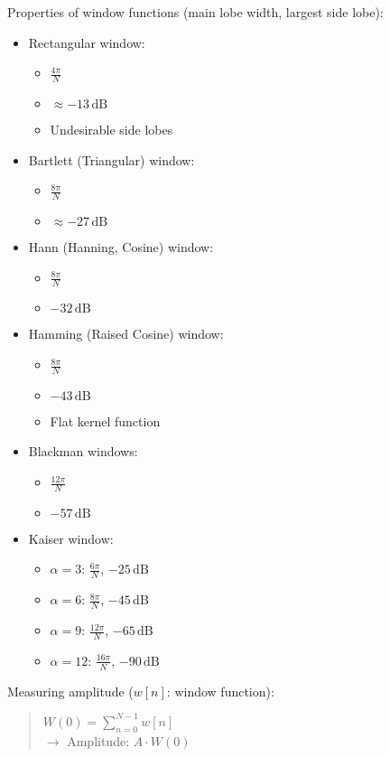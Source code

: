 \documentclass[fontsize=9pt,a4paper,twocolumn]{scrartcl}
\begin{document}
Properties of window functions (main lobe width, largest side lobe):
\begin{itemize}
	\item Rectangular window:
	\begin{itemize}
		\item $\frac{4\pi}{N}$
		\item $\approx -13\,\mathrm{dB}$
		\item Undesirable side lobes
	\end{itemize}
	\item Bartlett (Triangular) window:
	\begin{itemize}
		\item $\frac{8\pi}{N}$
		\item $\approx -27\,\mathrm{dB}$
	\end{itemize}
	\item Hann (Hanning, Cosine) window:
	\begin{itemize}
		\item $\frac{8\pi}{N}$
		\item $-32\,\mathrm{dB}$
	\end{itemize}
	\item Hamming (Raised Cosine) window:
	\begin{itemize}
		\item $\frac{8\pi}{N}$
		\item $-43\,\mathrm{dB}$
		\item Flat kernel function
	\end{itemize}
	\item Blackman windows:
	\begin{itemize}
		\item $\frac{12\pi}{N}$
		\item $-57\,\mathrm{dB}$
	\end{itemize}
	\item Kaiser window:
	\begin{itemize}
		\item $\alpha=3$: $\frac{6\pi}{N}$, $-25\,\mathrm{dB}$
		\item $\alpha=6$: $\frac{8\pi}{N}$, $-45\,\mathrm{dB}$
		\item $\alpha=9$: $\frac{12\pi}{N}$, $-65\,\mathrm{dB}$
		\item $\alpha=12$: $\frac{16\pi}{N}$, $-90\,\mathrm{dB}$
	\end{itemize}
\end{itemize}

Measuring amplitude ($w[n]$: window function):
\begin{quote}
	$W(0) = \sum_{n=0}^{N-1} w[n]$\\
	$\to$ Amplitude: $A\cdot W(0)$
\end{quote}
\end{document}
